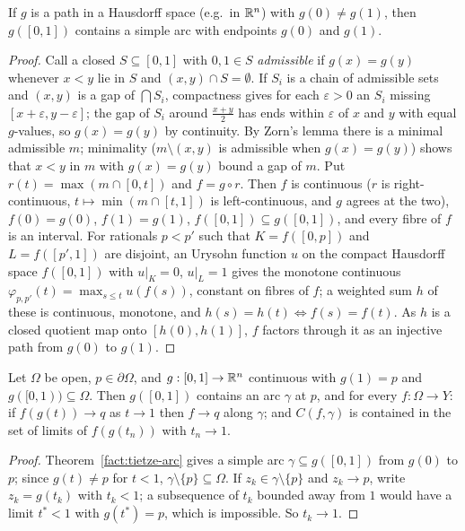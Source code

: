 \begin{theorem}\label{fact:tietze-arc}
If $g$ is a path in a Hausdorff space (e.g.\ in $\mathbb{R}^n$) with $g(0)\ne g(1)$, then $g([0,1])$
contains a simple arc with endpoints $g(0)$ and $g(1)$.
\end{theorem}
\begin{proof}
Call a closed $S\subseteq[0,1]$ with $0,1\in S$ \emph{admissible} if $g(x)=g(y)$ whenever $x<y$ lie in
$S$ and $(x,y)\cap S=\emptyset$. If $S_i$ is a chain of admissible sets and $(x,y)$ is a gap of
$\bigcap S_i$, compactness gives for each $\varepsilon>0$ an $S_i$ missing
$[x+\varepsilon,y-\varepsilon]$; the gap of $S_i$ around $\frac{x+y}2$ has ends within $\varepsilon$ of
$x$ and $y$ with equal $g$-values, so $g(x)=g(y)$ by continuity. By Zorn's lemma there is a minimal
admissible $m$; minimality ($m\setminus(x,y)$ is admissible when $g(x)=g(y)$) shows that $x<y$ in $m$
with $g(x)=g(y)$ bound a gap of $m$. Put $r(t)=\max(m\cap[0,t])$ and $f=g\circ r$. Then $f$ is
continuous ($r$ is right-continuous, $t\mapsto\min(m\cap[t,1])$ is left-continuous, and $g$ agrees at
the two), $f(0)=g(0)$, $f(1)=g(1)$, $f([0,1])\subseteq g([0,1])$, and every fibre of $f$ is an
interval. For rationals $p<p'$ such that $K=f([0,p])$ and $L=f([p',1])$ are disjoint, an Urysohn
function $u$ on the compact Hausdorff space $f([0,1])$ with $u|_K=0$, $u|_L=1$ gives the monotone
continuous $\varphi_{p,p'}(t)=\max_{s\le t}u(f(s))$, constant on fibres of $f$; a weighted sum $h$ of
these is continuous, monotone, and $h(s)=h(t)\iff f(s)=f(t)$. As $h$ is a closed quotient map onto
$[h(0),h(1)]$, $f$ factors through it as an injective path from $g(0)$ to $g(1)$.
\end{proof}

\begin{corollary}\label{cor:path-arc}
Let $\Omega$ be open, $p\in\partial\Omega$, and $g:[0,1]\to\mathbb{R}^n$ continuous with $g(1)=p$ and
$g([0,1))\subseteq\Omega$. Then $g([0,1])$ contains an arc $\gamma$ at $p$, and for every
$f:\Omega\to Y$: if $f(g(t))\to q$ as $t\to1$ then $f\to q$ along $\gamma$; and $C(f,\gamma)$ is
contained in the set of limits of $f(g(t_n))$ with $t_n\to1$.
\end{corollary}
\begin{proof}
Theorem~\ref{fact:tietze-arc} gives a simple arc $\gamma\subseteq g([0,1])$ from $g(0)$ to $p$; since
$g(t)\ne p$ for $t<1$, $\gamma\setminus\{p\}\subseteq\Omega$. If $z_k\in\gamma\setminus\{p\}$ and
$z_k\to p$, write $z_k=g(t_k)$ with $t_k<1$; a subsequence of $t_k$ bounded away from $1$ would have a
limit $t^*<1$ with $g(t^*)=p$, which is impossible. So $t_k\to1$.
\end{proof}

